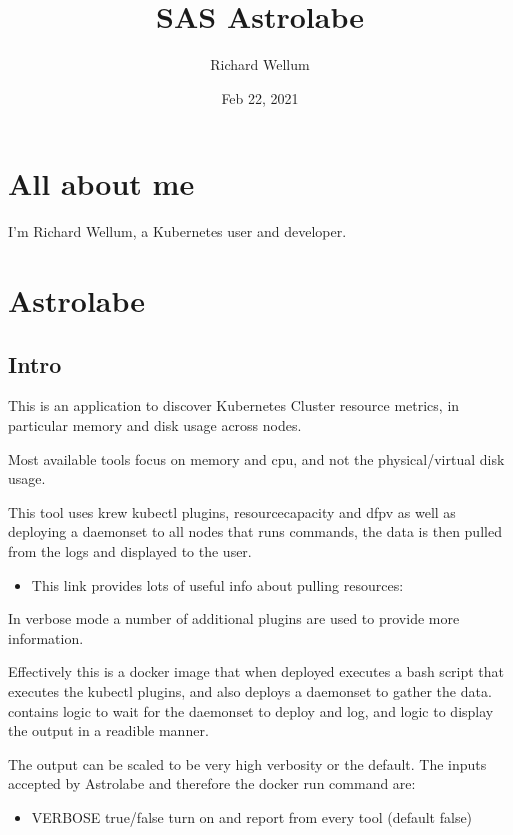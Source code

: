 \documentclass[letterpaper,10pt,english]{sphinxmanual}
\title{SAS Astrolabe}
\date{Feb 22, 2021}
\author{Richard Wellum}
\begin{document}
\pagestyle{empty}
\sphinxmaketitle
\pagestyle{plain}
\sphinxtableofcontents
\pagestyle{normal}
\label{\detokenize{index::doc}}



\chapter{All about me}
\label{\detokenize{all-about-me:all-about-me}}\label{\detokenize{all-about-me::doc}}
I’m Richard Wellum, a Kubernetes user and developer.


\chapter{Astrolabe}
\label{\detokenize{README:astrolabe}}\label{\detokenize{README::doc}}

\section{Intro}
\label{\detokenize{README:intro}}
This is an application to discover Kubernetes Cluster resource metrics, in
particular memory and disk usage across nodes.

Most available tools focus on memory and cpu, and not the physical/virtual disk
usage.

This tool uses krew kubectl plugins, resource\sphinxhyphen{}capacity and df\sphinxhyphen{}pv as well as
deploying a daemonset to all nodes that runs commands, the data is then pulled
from the logs and displayed to the user.
\begin{itemize}
\item {} 
This link provides lots of useful info about pulling resources: 

\end{itemize}

In verbose mode a number of additional plugins are used to provide more
information.

Effectively this is a docker image that when deployed executes a bash script
 that executes the kubectl plugins, and also deploys a
daemonset to gather the data.  contains logic to wait for the
daemonset to deploy and log, and logic to display the output in a readible
manner.

The output can be scaled to be very high verbosity or the default. The inputs
accepted by Astrolabe and therefore the docker run command are:
\begin{itemize}
\item {} 
VERBOSE \sphinxhyphen{} true/false \sphinxhyphen{} turn on and report from every tool (default false)

\end{itemize}
\end{document}

